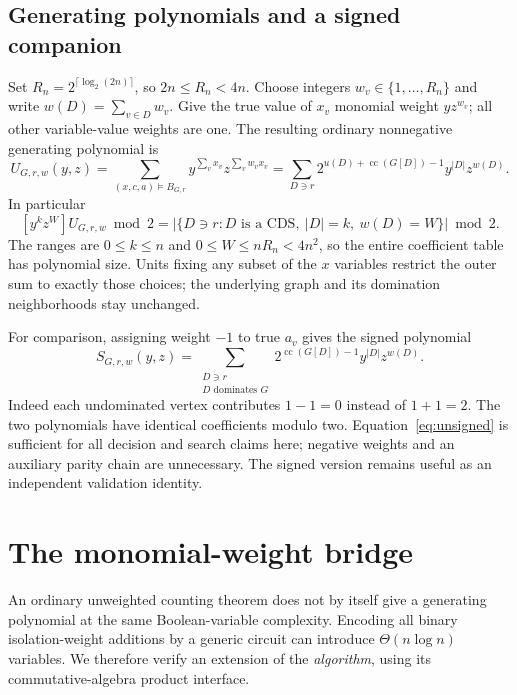 \documentclass[11pt]{article}
\theoremstyle{remark}\newtheorem{remark}[theorem]{Remark}
\newcommand{\cc}{\operatorname{cc}}
\begin{document}
\subsection{Generating polynomials and a signed companion}
Set $R_n=2^{\lceil\log_2(2n)\rceil}$, so $2n\le R_n<4n$.
Choose integers $w_v\in\{1,\ldots,R_n\}$ and write
$w(D)=\sum_{v\in D}w_v$. Give the true value of $x_v$ monomial weight
$y z^{w_v}$; all other variable-value weights are one. The resulting
ordinary nonnegative generating polynomial is
\begin{equation}\label{eq:unsigned}
 U_{G,r,w}(y,z)=
 \sum_{(x,c,a)\models B_{G,r}}y^{\sum_vx_v}z^{\sum_vw_vx_v}
 =\sum_{D\ni r}2^{u(D)+\cc(G[D])-1}y^{|D|}z^{w(D)}.
\end{equation}
In particular
\begin{equation}\label{eq:parity}
 [y^kz^W]U_{G,r,w}\bmod2
 =|\{D\ni r:D\text{ is a CDS},\ |D|=k,\ w(D)=W\}|\bmod2.
\end{equation}
The ranges are $0\le k\le n$ and $0\le W\le nR_n<4n^2$, so the entire
coefficient table has polynomial size. Units fixing any subset of the
$x$ variables restrict the outer sum to exactly those choices; the
underlying graph and its domination neighborhoods stay unchanged.

For comparison, assigning weight $-1$ to true $a_v$ gives the signed
polynomial
\begin{equation}\label{eq:signed}
 S_{G,r,w}(y,z)=
 \sum_{\substack{D\ni r\\D\text{ dominates }G}}
 2^{\cc(G[D])-1}y^{|D|}z^{w(D)}.
\end{equation}
Indeed each undominated vertex contributes $1-1=0$ instead of $1+1=2$.
The two polynomials have identical coefficients modulo two.
Equation~\eqref{eq:unsigned} is sufficient for all decision and search
claims here; negative weights and an auxiliary parity chain are unnecessary.
The signed version remains useful as an independent validation identity.

\section{The monomial-weight bridge}\label{sec:bridge}
An ordinary unweighted counting theorem does not by itself give a
generating polynomial at the same Boolean-variable complexity. Encoding
all binary isolation-weight additions by a generic circuit can introduce
$\Theta(n\log n)$ variables. We therefore verify an extension of the
\emph{algorithm}, using its commutative-algebra product interface.
\end{document}
